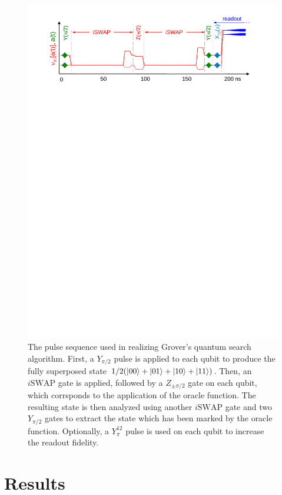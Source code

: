 \begin{figure}[htb!]
	\centering
		\includegraphics[width=1.\textwidth]{./material/papers/grover/figures/grover_algorithm_pulse_sequence}
	\caption[Pulse sequence used for implementing Grovers search algorithm]{The pulse sequence used in realizing Grover's quantum search algorithm. First, a $Y_{\pi/2}$ pulse is applied to each qubit to produce the fully superposed state $1/2(\left| 00 \right>+\left| 01 \right>+\left| 10 \right>+\left| 11 \right>)$. Then, an $i\mathrm{SWAP}$ gate is applied, followed by a $Z_{\pm \pi /2}$ gate on each qubit, which corrsponds to the application of the oracle function. The resulting state is then analyzed using another $i\mathrm{SWAP}$ gate and two $Y_{\pi/2}$ gates to extract the state which has been marked by the oracle function. Optionally, a $Y^{12}_{\pi}$ pulse is used on each qubit to increase the readout fidelity.}
	\label{fig:GroverPulseSequence}
\end{figure}

\section{Results}

